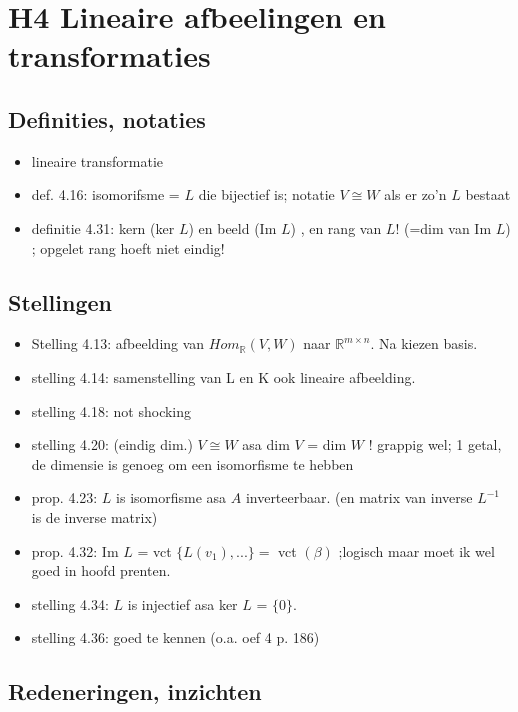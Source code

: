 \documentclass{article}
\begin{document}
\section{H4 Lineaire afbeelingen en transformaties}

\subsection{Definities, notaties}
\begin{itemize}
    \item lineaire transformatie
    \item def. 4.16: isomorifsme = $L$ die bijectief is; notatie $V \cong W$ als er zo'n $L$ bestaat
    \item definitie 4.31: kern (ker $L$) en beeld (Im $L$) , en rang van $L$! (=dim van Im $L$) ; opgelet rang hoeft niet eindig! 
\end{itemize}

\subsection{Stellingen}
\begin{itemize}
    \item Stelling 4.13: afbeelding van $Hom_{\mathbb{R}}(V,W)$ naar $\mathbb{R}^{m \times n}$. Na kiezen basis. 
    \item stelling 4.14: samenstelling van L en K ook lineaire afbeelding. 
    \item stelling 4.18: not shocking 
    \item stelling 4.20: (eindig dim.) $V \cong W$ asa dim $V$ = dim $W$ ! grappig wel; 1 getal, de dimensie is genoeg om een isomorfisme te hebben
    \item prop. 4.23: $L$ is isomorfisme asa $A$ inverteerbaar. (en matrix van inverse $L^{-1}$ is de inverse matrix) 
    \item prop. 4.32: Im $L$ = vct $\{ L(v_1), ... \} = $ vct $(\beta)$ ;logisch maar moet ik wel goed in hoofd prenten. 
    \item stelling 4.34: $L$ is injectief asa ker $L$ = $\{ 0 \}$. 
    \item stelling 4.36: goed te kennen (o.a. oef 4 p. 186)  
\end{itemize}

\subsection{Redeneringen, inzichten}
\end{document}
